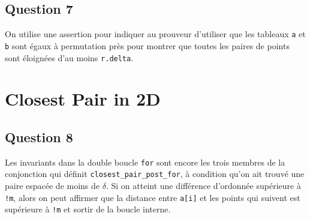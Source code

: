 \documentclass[11pt, openany, a4paper]{article}
\newcommand{\clofor}{\texttt{closest\_pair\_post\_for}}
\begin{document}
\subsection*{Question 7} 

On utilise une assertion pour indiquer au prouveur d'utiliser que les tableaux \texttt{a} et \texttt{b} sont égaux à permutation près pour montrer que toutes les paires de points sont éloignées d'au moins \texttt{r.delta}.

\section{Closest Pair in 2D}

\subsection*{Question 8}

Les invariants dans la double boucle \texttt{for} sont encore les trois membres de la conjonction qui définit \clofor, à condition qu'on ait trouvé une paire espacée de moins de $\delta$. Si on atteint une différence d'ordonnée supérieure à \texttt{!m}, alors on peut affirmer que la distance entre \texttt{a[i]} et les points qui suivent est supérieure à \texttt{!m} et sortir de la boucle interne.
\end{document}
